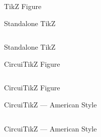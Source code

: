 \begin{frame}{TikZ Figure}
    
\end{frame}


\begin{frame}[fragile]{Standalone TikZ}
    \begin{listing}
        \inputminted[fontsize=\footnotesize]{latex}{assets/tex/figures/tikz-standalone.tex}
        \caption{Including the compiled standalone TikZ figure}
    \end{listing}
\end{frame}

\begin{frame}{Standalone TikZ}
    
\end{frame}

\begin{frame}[fragile]{CircuiTikZ Figure}
    \begin{listing}
        \inputminted[fontsize=\footnotesize]{latex}{assets/tex/figures/circuitikz.tex}
        \caption{Drawing a circuit directly inside a frame}
    \end{listing}
\end{frame}

\begin{frame}{CircuiTikZ Figure}
    
\end{frame}

\begin{frame}[fragile]{CircuiTikZ --- American Style}
    \begin{listing}
        \inputminted[fontsize=\tiny]{latex}{assets/tex/figures/circuitikz-american.tex}
        \caption{Switching to American component symbols}
    \end{listing}
\end{frame}

\begin{frame}{CircuiTikZ --- American Style}
    
\end{frame}

